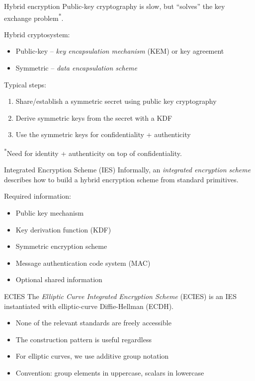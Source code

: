 \begin{frame}{Hybrid encryption}
  Public-key cryptography is slow, but \enquote{solves} the key exchange problem\textsuperscript{*}.

  \pause
  Hybrid cryptosystem:
  \begin{itemize}
    \item Public-key -- \emph{key encapsulation mechanism} (KEM) or key agreement
    \item Symmetric -- \emph{data encapsulation scheme}
  \end{itemize}

  \vspace*{0.5em}

  \pause
  Typical steps:
  \begin{enumerate}[<+(1)->]
    \item Share/establish a symmetric secret using public key cryptography
    \item Derive symmetric keys from the secret with a KDF
    \item Use the symmetric keys for confidentiality + authenticity
  \end{enumerate}

  \vspace*{0.5em}

  \pause
  {\scriptsize \textsuperscript{*}Need for identity + authenticity on top of confidentiality.}
\end{frame}

\begin{frame}{Integrated Encryption Scheme (IES)}
  Informally, an \emph{integrated encryption scheme} describes how to build a hybrid encryption scheme from standard primitives.

  \vspace*{1em}

  \pause
  Required information:
  \begin{itemize}[<+(1)->]
    \item Public key mechanism
    \item Key derivation function (KDF)
    \item Symmetric encryption scheme
    \item Message authentication code system (MAC)
    \item Optional shared information
  \end{itemize}
\end{frame}

\begin{frame}{ECIES}
  The \emph{Elliptic Curve Integrated Encryption Scheme} (ECIES) is an IES instantiated with elliptic-curve Diffie-Hellman (ECDH).
  \begin{itemize}[<+(1)->]
    \item None of the relevant standards are freely accessible
    \item The construction pattern is useful regardless
    \item For elliptic curves, we use additive group notation
    \item Convention: group elements in uppercase, scalars in lowercase
  \end{itemize}
\end{frame}

